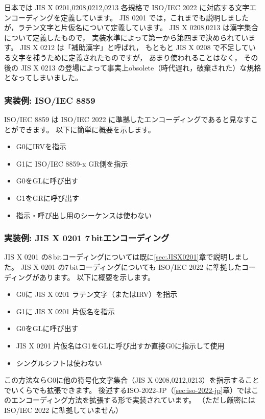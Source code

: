 \documentclass[a4j,10pt,fleqn]{jsarticle}
\begin{document}
日本では JIS X 0201,0208,0212,0213 各規格で ISO/IEC 2022 に対応する文字エンコーディングを定義しています。
JIS 0201 では，これまでも説明しましたが，ラテン文字と片仮名について定義しています。
JIS X 0208,0213 は漢字集合について定義したもので，
実装水準によって第一から第四まで決められています。
JIS X 0212 は「補助漢字」と呼ばれ，
もともと JIS X 0208 で不足している文字を補うために定義されたものですが，
あまり使われることはなく，
その後の JIS X 0213 の登場によって事実上obsolete（時代遅れ，破棄された）な規格となってしまいました。

\subsubsection{実装例: ISO/IEC 8859}

ISO/IEC 8859 は ISO/IEC 2022 に準拠したエンコーディングであると見なすことができます。
以下に簡単に概要を示します。
\begin{itemize}
\item G0にIRVを指示
\item G1に ISO/IEC 8859-x GR側を指示
\item G0をGLに呼び出す
\item G1をGRに呼び出す
\item 指示・呼び出し用のシーケンスは使わない
\end{itemize}

\subsubsection{実装例: JIS X 0201 7\,bitエンコーディング} \label{sec:JISX0201-7}

JIS X 0201 の8\,bitコーディングについては既に\ref{sec:JISX0201}章で説明しました。
JIS X 0201 の7\,bitコーディングについても ISO/IEC 2022 に準拠したコーディングがあります。
以下に概要を示します。
\begin{itemize}
\item G0に JIS X 0201 ラテン文字（またはIRV）を指示
\item G1に JIS X 0201 片仮名を指示
\item G0をGLに呼び出す
\item JIS X 0201 片仮名はG1をGLに呼び出すか直接G0に指示して使用
\item シングルシフトは使わない
\end{itemize}

この方法ならG0に他の符号化文字集合（JIS X 0208,0212,0213）を指示することでいくらでも拡張できます。
後述するISO-2022-JP（\ref{sec:iso-2022-jp}章）ではこのエンコーディング方法を拡張する形で実装されています。
（ただし厳密には ISO/IEC 2022 に準拠していません）
\end{document}
